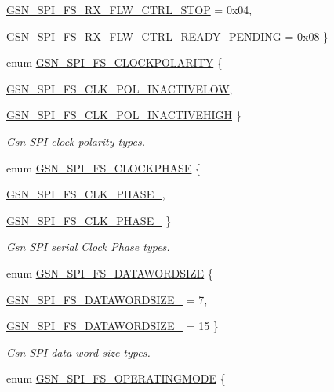 \begin{DoxyCompactItemize}
\par
\hyperlink{a00589_a8fba8ef99bde7d11e4f9178b501de8cda4f3aef972e12fcc591f47b0839b30680}{GSN\_\-SPI\_\-FS\_\-RX\_\-FLW\_\-CTRL\_\-STOP} =  0x04, 
\par
\hyperlink{a00589_a8fba8ef99bde7d11e4f9178b501de8cdaebbaf2a55c30563b6e3f7cd52bd7a82f}{GSN\_\-SPI\_\-FS\_\-RX\_\-FLW\_\-CTRL\_\-READY\_\-PENDING} =  0x08
 \}
\item 
enum \hyperlink{a00655_ga5d0a21479bf57ff38c1c967f95ea5e83}{GSN\_\-SPI\_\-FS\_\-CLOCKPOLARITY} \{ \par
\hyperlink{a00655_gga5d0a21479bf57ff38c1c967f95ea5e83aabbe13ebea335b5e2423a7eaafe92692}{GSN\_\-SPI\_\-FS\_\-CLK\_\-POL\_\-INACTIVELOW}, 
\par
\hyperlink{a00655_gga5d0a21479bf57ff38c1c967f95ea5e83ae452187e9202e738ad42a71388a2ea72}{GSN\_\-SPI\_\-FS\_\-CLK\_\-POL\_\-INACTIVEHIGH}
 \}
\begin{DoxyCompactList}\small\item\em Gsn SPI clock polarity types. \end{DoxyCompactList}\item 
enum \hyperlink{a00655_gae764e5eefaf1dedaf1561a7cd3ccb6aa}{GSN\_\-SPI\_\-FS\_\-CLOCKPHASE} \{ \par
\hyperlink{a00655_ggae764e5eefaf1dedaf1561a7cd3ccb6aaae053afe0021f0be80f2318093df597fd}{GSN\_\-SPI\_\-FS\_\-CLK\_\-PHASE\_}, 
\par
\hyperlink{a00655_ggae764e5eefaf1dedaf1561a7cd3ccb6aaa30f2e6a4ca4727ce627063d9d1d28c5a}{GSN\_\-SPI\_\-FS\_\-CLK\_\-PHASE\_}
 \}
\begin{DoxyCompactList}\small\item\em Gsn SPI serial Clock Phase types. \end{DoxyCompactList}\item 
enum \hyperlink{a00655_ga14e8640824b36f8fbc046289a0fef146}{GSN\_\-SPI\_\-FS\_\-DATAWORDSIZE} \{ \par
\hyperlink{a00655_gga14e8640824b36f8fbc046289a0fef146a2f3788be6ad47f636bdc56a18c3ae916}{GSN\_\-SPI\_\-FS\_\-DATAWORDSIZE\_} =  7, 
\par
\hyperlink{a00655_gga14e8640824b36f8fbc046289a0fef146a37642fddaf6667dfed19bacf3bd21a75}{GSN\_\-SPI\_\-FS\_\-DATAWORDSIZE\_} =  15
 \}
\begin{DoxyCompactList}\small\item\em Gsn SPI data word size types. \end{DoxyCompactList}\item 
enum \hyperlink{a00655_ga9ef97e579e4f3e5d828b8bc2c0c58d73}{GSN\_\-SPI\_\-FS\_\-OPERATINGMODE} \{ \par

\end{DoxyCompactItemize}
